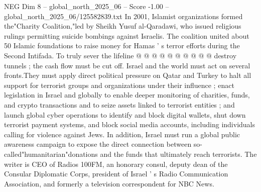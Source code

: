 \begin{textsample}{NEG Dim 8 – global\_north\_2025\_06 – Score -1.00 – global\_north\_2025\_06/125582839.txt}
In 2001, Islamist organizations formed the"Charity Coalition,"led by Sheikh Yusuf al-Qaradawi, who issued religious rulings permitting suicide bombings against Israelis.
The coalition united about 50 Islamic foundations to raise money for Hamas ' s terror efforts during the Second Intifada.
To truly sever the lifeline @ @ @ @ @ @ @ @ @ @ destroy tunnels ; the cash flow must be cut off.
Israel and the world must act on several fronts.They must apply direct political pressure on Qatar and Turkey to halt all support for terrorist groups and organizations under their influence ; enact legislation in Israel and globally to enable deeper monitoring of charities, funds, and crypto transactions and to seize assets linked to terrorist entities ; and launch global cyber operations to identify and block digital wallets, shut down terrorist payment systems, and block social media accounts, including individuals calling for violence against Jews.
In addition, Israel must run a global public awareness campaign to expose the direct connection between so-called"humanitarian"donations and the funds that ultimately reach terrorists.
The writer is CEO of Radios 100FM, an honorary consul, deputy dean of the Consular Diplomatic Corps, president of Israel ' s Radio Communication Association, and formerly a television correspondent for NBC News.

\end{textsample}
